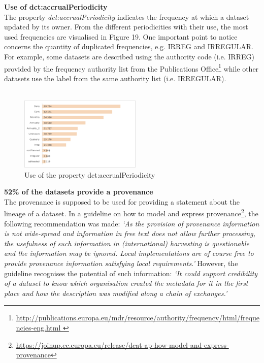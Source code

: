 \documentclass[<options>]{elsarticle}
\begin{document}
\textbf{Use of dct:accrualPeriodicity}\\
The property \textit{dct:accrualPeriodicity} indicates the frequency at which a dataset updated by its owner. From the different periodicities with their use, the most used frequencies are visualised in Figure 19. One important point to notice concerns the quantity of duplicated frequencies, e.g. IRREG and IRREGULAR. For example, some datasets are described using the authority code (i.e. IRREG) provided by the frequency authority list from the Publications Office\footnote{\href{http://publications.europa.eu/mdr/resource/authority/frequency/html/frequencies-eng.html }{ http://publications.europa.eu/mdr/resource/authority/frequency/html/frequencies-eng.html }} while other datasets use the label from the same authority list (i.e. IRREGULAR). 
\\
\\
\begin{figure}[!h]
\includegraphics{replace22.png}
\caption{Use of the property dct:accrualPeriodicity}
\end{figure}
\textbf{52\% of the datasets provide a provenance}\\
The provenance is supposed to be used for providing a statement about the lineage of a dataset. In a guideline on how to model and express provenance\footnote{\href{  https://joinup.ec.europa.eu/release/dcat-ap-how-model-and-express-provenance}{  https://joinup.ec.europa.eu/release/dcat-ap-how-model-and-express-provenance}}, the following recommendation was made: \textit{‘As the provision of provenance information is not wide-spread and information in free text does not allow further processing, the usefulness of such information in (international) harvesting is questionable and the information may be ignored. Local implementations are of course free to provide provenance information satisfying local requirements.’ }However, the guideline recognises the potential of such information: \textit{‘It could support credibility of a dataset to know which organisation created the metadata for it in the first place and how the description was modified along a chain of exchanges.’}\\
\end{document}
